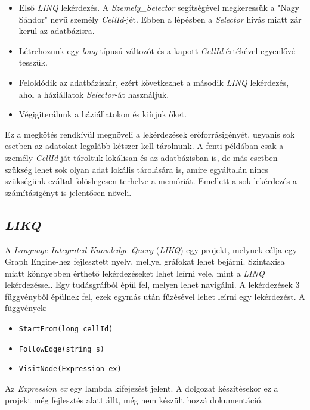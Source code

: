 \begin{itemize}
	\item Első \emph{LINQ} lekérdezés. A \emph{Szemely\_Selector} segítségével megkeressük a "Nagy Sándor" nevű személy \emph{CellId}-jét. Ebben a lépésben a \emph{Selector} hívás miatt zár kerül az adatbázisra.
	\item Létrehozunk egy \emph{long} típusú változót és a kapott \emph{CellId} értékével egyenlővé tesszük.
	\item Feloldódik az adatbáziszár, ezért következhet a második \emph{LINQ} lekérdezés, ahol a háziállatok \emph{Selector}-át használjuk.
	\item Végigiterálunk a háziállatokon és kiírjuk őket.
\end{itemize}

Ez a megkötés rendkívül megnöveli a lekérdezések erőforrásigényét, ugyanis sok esetben az adatokat legalább kétszer kell tárolnunk. A fenti példában csak a személy \emph{CellId}-ját tároltuk lokálisan és az adatbázisban is, de más esetben szükség lehet sok olyan adat lokális tárolására is, amire egyáltalán nincs szükségünk ezáltal fölöslegesen terhelve a memóriát. Emellett a sok lekérdezés a számításigényt is jelentősen növeli.

\subsection{\emph{LIKQ}}

A \emph{Language-Integrated Knowledge Query} (\emph{LIKQ}) egy projekt, melynek célja egy Graph Engine-hez fejlesztett nyelv, mellyel gráfokat lehet bejárni. Szintaxisa miatt könnyebben érthető lekérdezéseket lehet leírni vele, mint a \emph{LINQ} lekérdezéssel. Egy tudásgráfból épül fel, melyen lehet navigálni. A lekérdezések 3 függvényből épülnek fel, ezek egymás után fűzésével lehet leírni egy lekérdezést. A függvények:

\begin{itemize}
	\item \texttt{StartFrom(long cellId)}
	\item \texttt{FollowEdge(string s)}
	\item \texttt{VisitNode(Expression ex)}
\end{itemize}

Az \emph{Expression ex} egy lambda kifejezést jelent. A dolgozat készítésekor ez a projekt még fejlesztés alatt állt, még nem készült hozzá dokumentáció. 